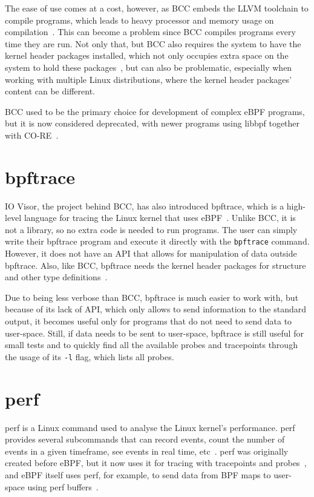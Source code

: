 The ease of use comes at a cost, however, as \ac{BCC} embeds the LLVM toolchain
to compile programs, which leads to heavy processor and memory usage on
compilation~\cite{pingcap,contain}. This can become a problem since \ac{BCC}
compiles programs every time they are run. Not only that, but \ac{BCC} also
requires the system to have the kernel header packages installed, which not only
occupies extra space on the system to hold these
packages~\cite{pingcap,contain}, but can also be problematic, especially when
working with multiple Linux distributions, where the kernel header packages'
content can be different.

BCC used to be the primary choice for development of complex eBPF programs, but
it is now considered deprecated, with newer programs using libbpf together with
\ac{CO-RE}~\cite{toolsfuture}.


\section{bpftrace}

IO Visor, the project behind \ac{BCC}, has also introduced bpftrace, which is a
high-level language for tracing the Linux kernel that uses eBPF~\cite{bpftrace}.
Unlike \ac{BCC}, it is not a library, so no extra code is needed to run
programs. The user can simply write their bpftrace program and execute it
directly with the \texttt{bpftrace} command. However, it does not have an API
that allows for manipulation of data outside bpftrace. Also, like \ac{BCC},
bpftrace needs the kernel header packages for structure and other type
definitions~\cite{bpftrace}.

Due to being less verbose than \ac{BCC}, bpftrace is much easier to work with,
but because of its lack of API, which only allows to send information to the
standard output, it becomes useful only for programs that do not need to send
data to user-space. Still, if data needs to be sent to user-space, bpftrace is
still useful for small tests and to quickly find all the available probes and
tracepoints through the usage of its \texttt{-l} flag, which lists all probes.


\section{perf}

perf is a Linux command used to analyse the Linux kernel's performance. perf
provides several subcommands that can record events, count the number of events
in a given timeframe, see events in real time, etc~\cite{perf}. perf was
originally created before eBPF, but it now uses it for tracing with tracepoints
and probes~\cite{greggperf}, and eBPF itself uses perf, for example, to send
data from BPF maps to user-space using perf buffers~\cite{perfring}.

